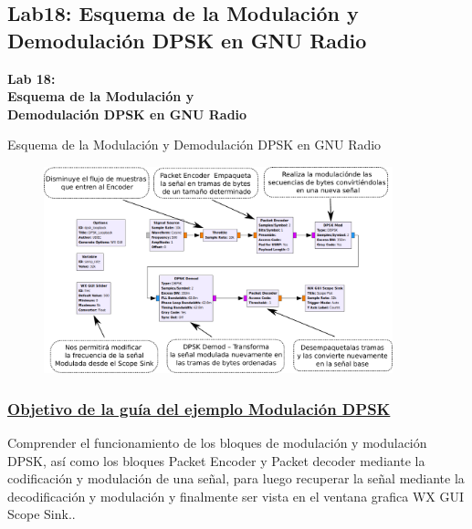 \subsection{Lab18: Esquema de la Modulación y Demodulación DPSK en GNU Radio}
\begin{frame}{}


\bfseries{\textrm{ \Large Lab 18: \\Esquema de la Modulación y \\Demodulación DPSK en GNU Radio}}
\raggedright
\end{frame}

\begin{frame}{Esquema de la Modulación y Demodulación DPSK en GNU Radio}
\begin{figure}[H]
	\vspace{-3mm}
	\centering
	\includegraphics[width=0.9\textwidth]{Modulaciones_digitales/lab18/pdf/01Inicio.pdf}
\end{figure}
\end{frame}

	\begin{frame}
	\frametitle{\underline{\textbf{Objetivo de la guía del ejemplo Modulación DPSK}}}	
	Comprender el funcionamiento de los bloques de modulación y modulación DPSK, así como los bloques Packet Encoder y Packet decoder mediante la codificación y modulación de una señal, para luego recuperar la señal mediante la decodificación y modulación y finalmente ser vista en el ventana grafica WX GUI Scope Sink..\vspace{2mm}
	\end{frame}

